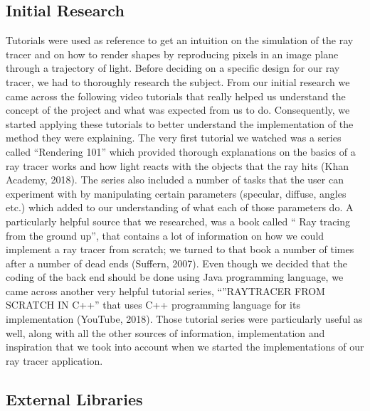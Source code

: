 \documentclass[11pt,a4paper]{article}
\begin{document}
\subsection{Initial Research}
Tutorials were used as reference to get an intuition on the simulation of the ray tracer and on how to render shapes by reproducing pixels in an image plane through a trajectory of light. Before deciding on a specific design for our ray tracer, we had to thoroughly research the subject. From our initial research we came across the following video tutorials that really helped us understand the concept of the project and what was expected from us to do. Consequently, we started applying these tutorials to better understand the implementation of the method they were explaining. 
The very first tutorial we watched was a series called “Rendering 101” which provided thorough explanations on the basics of a ray tracer works and how light reacts with the objects that the ray hits  (Khan Academy, 2018). The series also included a number of tasks that the user can experiment with by manipulating certain parameters (specular, diffuse, angles etc.) which added to our understanding of what each of those parameters do.
 A particularly helpful source that we researched, was a book called “ Ray tracing from the ground up”, that contains a lot of information on how we could implement a ray tracer from scratch; we turned to that book a number of times after a number of dead ends (Suffern, 2007). 
Even though we decided that the coding of the back end should be done using Java programming language, we came across another very helpful tutorial series, “”RAYTRACER FROM SCRATCH IN C++” that uses C++ programming language for its implementation (YouTube, 2018). Those tutorial series were particularly useful as well, along with all the other sources of information, implementation and inspiration that we took into account when we started the implementations of our ray tracer application.

\subsection{External Libraries}
\end{document}
